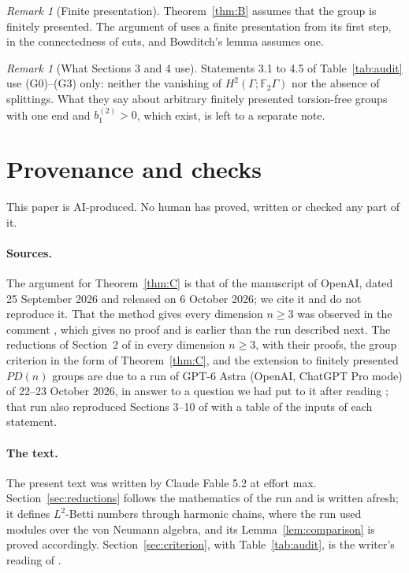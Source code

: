 \documentclass[11pt,a4paper]{article}
\theoremstyle{definition}
\theoremstyle{remark}
\newtheorem{remark}[lemma]{Remark}
\newcommand{\F}{\mathbb{F}}
\newcommand{\Gam}{\Gamma}
\newcommand{\bt}[1]{b^{(2)}_{#1}}
\begin{document}
\begin{remark}[Finite presentation]
Theorem~\ref{thm:B} assumes that the group is finitely presented. The argument of
\cite{O} uses a finite presentation from its first step, in the connectedness of
cuts, and Bowditch's lemma assumes one.
\end{remark}

\begin{remark}[What Sections 3 and 4 use]
Statements 3.1 to 4.5 of Table~\ref{tab:audit} use (G0)--(G3) only: neither the
vanishing of $H^2(\Gam;\F_2\Gam)$ nor the absence of splittings. What they say about
arbitrary finitely presented torsion-free groups with one end and $\bt{1}>0$,
which exist, is left to a separate note.
\end{remark}

\section{Provenance and checks}\label{sec:provenance}

This paper is AI-produced. No human has proved, written or checked any part of
it.

\paragraph{Sources.} The argument for Theorem~\ref{thm:C} is that of the
manuscript \cite{O} of OpenAI, dated 25 September 2026 and released on 6 October
2026; we cite it and do not reproduce it. That the method gives every dimension
$n\ge3$ was observed in the comment \cite{R}, which gives no proof and is
earlier than the run described next. The reductions of Section~2 of \cite{O} in
every dimension $n\ge3$, with their proofs, the group criterion in the form of
Theorem~\ref{thm:C}, and the extension to finitely presented $PD(n)$ groups are
due to a run of GPT-6 Astra (OpenAI, ChatGPT Pro mode) of 22--23 October 2026, in
answer to a question we had put to it after reading \cite{O}; that run also
reproduced Sections 3--10 of \cite{O} with a table of the inputs of each
statement.

\paragraph{The text.} The present text was written by Claude Fable 5.2 at effort
max. Section~\ref{sec:reductions} follows the mathematics of the run and is
written afresh; it defines $L^2$-Betti numbers through harmonic chains, where the
run used modules over the von Neumann algebra, and its Lemma~\ref{lem:comparison}
is proved accordingly. Section~\ref{sec:criterion}, with
Table~\ref{tab:audit}, is the writer's reading of \cite{O}.
\end{document}
